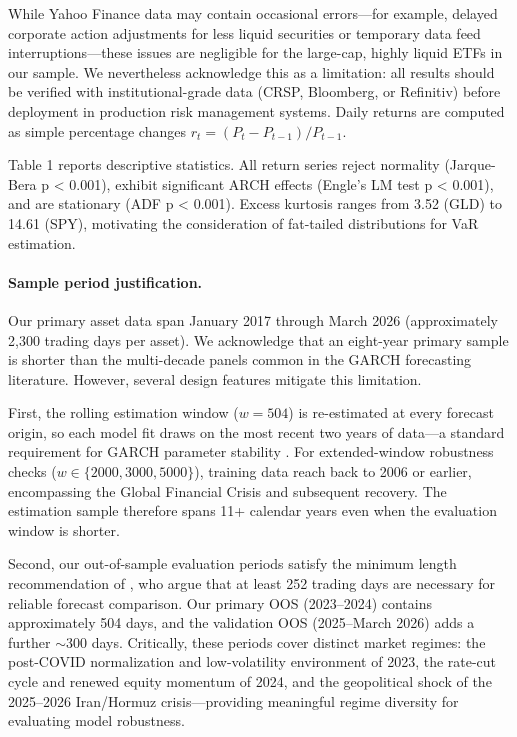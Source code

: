 While Yahoo Finance data may contain occasional errors---for example, delayed corporate action adjustments for less liquid securities or temporary data feed interruptions---these issues are negligible for the large-cap, highly liquid ETFs in our sample. We nevertheless acknowledge this as a limitation: all results should be verified with institutional-grade data (CRSP, Bloomberg, or Refinitiv) before deployment in production risk management systems. Daily returns are computed as simple percentage changes $r_t = (P_t - P_{t-1})/P_{t-1}$.

Table 1 reports descriptive statistics. All return series reject normality (Jarque-Bera p < 0.001), exhibit significant ARCH effects (Engle's LM test p < 0.001), and are stationary (ADF p < 0.001). Excess kurtosis ranges from 3.52 (GLD) to 14.61 (SPY), motivating the consideration of fat-tailed distributions for VaR estimation.

\paragraph{Sample period justification.} %
Our primary asset data span January 2017 through March 2026 (approximately 2,300 trading days per asset). We acknowledge that an eight-year primary sample is shorter than the multi-decade panels common in the GARCH forecasting literature. However, several design features mitigate this limitation.

First, the rolling estimation window ($w = 504$) is re-estimated at every forecast origin, so each model fit draws on the most recent two years of data---a standard requirement for GARCH parameter stability \citep{hwang2006}. For extended-window robustness checks ($w \in \{2000, 3000, 5000\}$), training data reach back to 2006 or earlier, encompassing the Global Financial Crisis and subsequent recovery. The estimation sample therefore spans 11+ calendar years even when the evaluation window is shorter.

Second, our out-of-sample evaluation periods satisfy the minimum length recommendation of \citet{hansen2005}, who argue that at least 252 trading days are necessary for reliable forecast comparison. Our primary OOS (2023--2024) contains approximately 504 days, and the validation OOS (2025--March 2026) adds a further $\sim$300 days. Critically, these periods cover distinct market regimes: the post-COVID normalization and low-volatility environment of 2023, the rate-cut cycle and renewed equity momentum of 2024, and the geopolitical shock of the 2025--2026 Iran/Hormuz crisis---providing meaningful regime diversity for evaluating model robustness.

